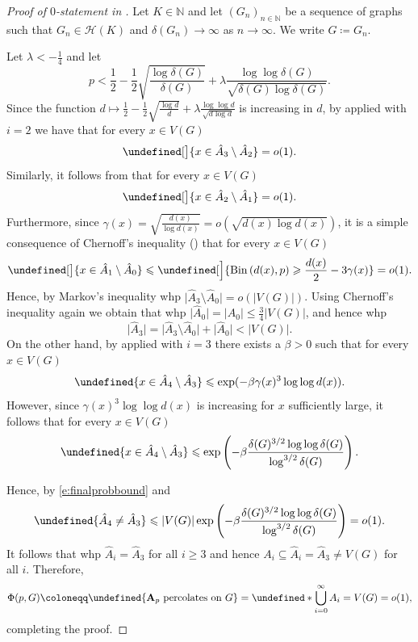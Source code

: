 \documentclass[reqno,a4paper,11pt]{amsart}
\theoremstyle{definition}
\newcommand{\Bin}{\operatorname{Bin}}
\newcommand{\dmin}{\delta(G)}
\renewcommand{\leq}{\leqslant}
\renewcommand{\geq}{\geqslant}
\let\Pr\undefined
\begin{document}
\begin{proof}[Proof of $0$-statement in ]
  Let $K \in \mathbb{N}$ and let $(G_n)_{n \in \mathbb{N}}$ be a sequence of graphs such that $G_n \in \mathcal{H}(K)$ and $\delta(G_n) \to \infty$ as $n \to \infty$.
  We write $G \coloneqq G_n$.

  Let $\lambda < -\frac{1}{4}$ and let
  \[
    p < \frac{1}{2}-\frac{1}{2} \sqrt{\frac{\log \dmin}{\dmin}} + \lambda \frac{\log \log \dmin}{\sqrt{\dmin \log \dmin}}.
  \]
  Since the function $d \mapsto \frac{1}{2}-\frac{1}{2}\sqrt{\frac{\log d}{d}} + \lambda \frac{\log \log d}{\sqrt{d \log d}}$ is increasing in $d$, by  applied with $i=2$ we have that for every $x \in V(G)$
  \[
    \Pr[\big]{x \in \hat{A}_3 \setminus \hat{A}_2} = o(1).
  \]
  Similarly, it follows from  that for every $x \in V(G)$
  \[
    \Pr[\big]{x \in \hat{A}_2 \setminus \hat{A}_1} = o(1).
  \]
  Furthermore, since $\gamma(x) = \sqrt{\frac{d(x)}{\log d(x)}}=o\left(\sqrt{d(x) \log d(x)}\right)$, it is a simple consequence of Chernoff's inequality () that for every $x \in V(G)$
  \[
    \Pr[\big]{x \in \hat{A}_1 \setminus \hat{A}_0} \leq \Pr[\Big]{\Bin\left(d(x), p\right) \geq \frac{d(x)}{2}-3\gamma(x)} = o(1).
  \]
  Hence, by Markov's inequality whp $\big|\hat{A}_3 \setminus \hat{A}_0 \big| = o\left(|V(G)|\right)$.
  Using Chernoff's inequality again we obtain that whp $\big|\hat{A}_0\big|=\big|A_0\big| \leq \frac{3}{4} |V(G)|$, and hence whp
  \[
    \big|\hat{A}_3\big| = \big|\hat{A}_3 \setminus \hat{A}_0 \big| + \big|\hat{A}_0\big| < |V(G)|.
  \]
  On the other hand, by  applied with $i=3$ there exists a $\beta >0$ such that for every $x \in V(G)$
  \[
    \Pr{x \in \hat{A}_4 \setminus \hat{A}_3} \leq \exp(-\beta \gamma(x)^3 \log \log d(x)).
  \]
  However, since $\gamma(x)^3 \log \log d(x)$ is increasing for $x$ sufficiently large, it follows that for every $x \in V(G)$
  \begin{equation}\label{e:finalprobbound}
    \Pr{x \in \hat{A}_4 \setminus \hat{A}_3} \leq \exp\left(-\beta \frac{\delta(G)^{3/2} \log \log \delta(G)}{\log^{3/2} \delta(G)}\right).
  \end{equation}

  Hence, by \eqref{e:finalprobbound} and 
  \[
    \Pr{\hat{A}_4 \neq \hat{A}_3} \leq |V(G)| \exp\left(-\beta \frac{\delta(G)^{3/2} \log \log \delta(G)}{\log^{3/2} \delta(G)}\right) = o(1).
  \]
  It follows that whp $\hat{A}_i = \hat{A}_3$ for all $i \geq 3$ and hence $A_i \subseteq \hat{A}_i = \hat{A}_3 \neq V(G)$ for all $i$.
  Therefore,
  \[
  \Phi(p,G) \coloneqq \Pr{\textbf{A}_p \text{ percolates on } G}= \Pr*{\bigcup_{i=0}^\infty A_i  = V(G)} = o(1),
  \]
completing the proof.
\end{proof}
\end{document}
